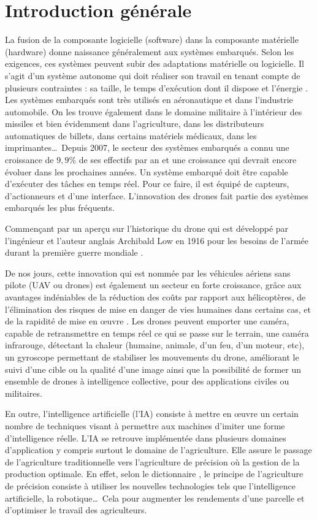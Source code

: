 \chapter*{\centering Introduction générale}
La fusion de la composante logicielle (software) dans la composante matérielle (hardware) donne naissance généralement aux systèmes embarqués.
Selon les exigences, ces systèmes peuvent subir des adaptations matérielle ou logicielle. Il s'agit d'un système autonome qui doit réaliser son travail en tenant compte de plusieurs contraintes : sa taille, le temps d'exécution dont il dispose et l'énergie \cite{FUTURA}. Les systèmes embarqués sont très utilisés en aéronautique et dans l'industrie automobile. On les trouve également dans le domaine militaire à l'intérieur des missiles et bien évidemment dans l'agriculture, dans les distributeurs automatiques de billets, dans certains matériels médicaux, dans les imprimantes\ldots\  Depuis 2007, le secteur des systèmes embarqués a connu une croissance de $9,9\%$ de ses effectifs par an \cite{PierreAudoin2012} et une croissance qui devrait encore évoluer dans les prochaines années. Un système embarqué doit être capable d'exécuter des tâches en temps réel. Pour ce faire, il est équipé de capteurs, d'actionneurs et d'une interface. L'innovation des drones fait partie des systèmes embarqués les plus fréquents. 

Commençant par un aperçu sur l'historique du drone qui est développé par l'ingénieur et l'auteur anglais Archibald Low en 1916 pour les besoins de l'armée durant la première guerre mondiale \cite{STUDIOFLY}. 

De nos jours, cette innovation qui est nommée par les véhicules aériens sans pilote (UAV ou drones) est également un secteur en forte croissance, grâce aux avantages indéniables de la réduction des coûts par rapport aux hélicoptères, de l'élimination des risques de mise en danger de vies humaines dans certains cas, et de la rapidité de mise en œuvre \cite{AltiGator}. Les drones peuvent emporter une caméra, capable de retransmettre en temps réel ce qui se passe sur le terrain, une caméra infrarouge, détectant la chaleur (humaine, animale, d'un feu, d'un moteur, etc), un gyroscope permettant de stabiliser les mouvements du drone, améliorant le suivi d'une cible ou la qualité d'une image ainsi que la possibilité de former un ensemble de drones à intelligence collective, pour des applications civiles ou militaires. 

En outre, l'intelligence artificielle (l'IA) consiste à mettre en œuvre un certain nombre de techniques visant à permettre aux machines d'imiter une forme d'intelligence réelle. L'IA se retrouve implémentée dans plusieurs domaines d'application\cite{netactions} y compris surtout le domaine de l'agriculture. Elle assure le passage de l'agriculture traditionnelle vers l'agriculture de précision où la gestion de la production optimale. En effet, selon le dictionnaire \cite{leshorizons}, le principe de l'agriculture de précision consiste à utiliser les nouvelles technologies tels que l'intelligence artificielle, la robotique\ldots\ Cela pour augmenter les rendements d'une parcelle et d'optimiser le travail des agriculteurs.

